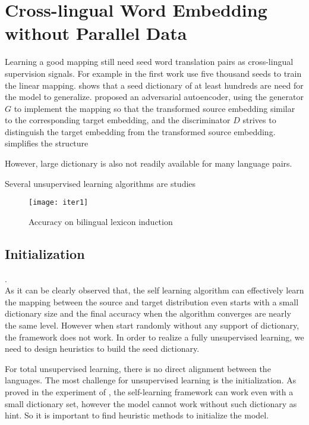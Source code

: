 \chapter{Cross-lingual Word Embedding without Parallel Data}

Learning a good mapping still need seed word translation pairs as cross-lingual supervision signals. For example in the first work use five thousand seeds to train the linear mapping. \cite{vulic2016role} shows that a seed dictionary of at least hundreds are need for the model to generalize.
\cite{zhang2017adversarial} proposed an adversarial autoencoder, using the generator $G$ to implement the mapping so that the transformed source embedding similar to the corresponding target embedding, and the discriminator $D$ strives to distinguish the target embedding from the transformed source embedding. \cite{conneau2017word} simplifies the structure


However, large dictionary is also not readily available for many language pairs.

Several unsupervised learning algorithms are studies   




\begin{figure}[t]
	\texttt{[image: iter1]}
	\centering
	\caption{Accuracy on bilingual lexicon induction}
\end{figure}	







\section{Initialization}
\cite{artetxe2018robust}.\\As it can be clearly observed that, the self learning algorithm can effectively learn the mapping between the source and target distribution even starts with a small dictionary size and the final accuracy when the algorithm converges are nearly the same level. However when start randomly without any support of dictionary, the framework does not work. In order to realize a fully unsupervised learning, we need to design heuristics to build the seed dictionary.

For total unsupervised learning, there is no direct alignment between the languages. 	The most challenge for unsupervised learning is the initialization. As proved in the experiment of \cite{}, the self-learning framework can work even with a small dictionary set, however the model cannot work without such dictionary as hint.  So it is important to find heuristic methods to initialize the model.

